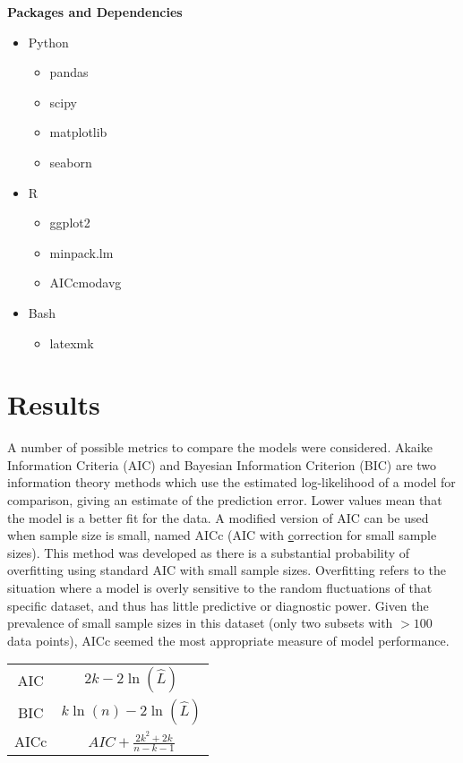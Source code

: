 \documentclass[11pt,a4wide,titlepage]{article}
\begin{document}
\noindent
\textbf{Packages and Dependencies}
\begin{itemize}
    \item Python
    \begin{itemize}
        \item pandas
        \item scipy
        \item matplotlib
        \item seaborn
    \end{itemize}
    \item R
    \begin{itemize}
        \item ggplot2
        \item minpack.lm
        \item AICcmodavg
    \end{itemize}
	\item Bash
	\begin{itemize}
		\item latexmk
	\end{itemize}
\end{itemize}



\section*{Results}
A number of possible metrics to compare the models were considered. Akaike Information Criteria (AIC) and Bayesian Information Criterion (BIC) are two information theory methods which use the estimated log-likelihood of a model for comparison, giving an estimate of the prediction error. Lower values mean that the model is a better fit for the data. A modified version of AIC can be used when sample size is small, named AICc (AIC with \underline{c}orrection for small sample sizes). This method was developed as there is a substantial probability of overfitting using standard AIC with small sample sizes. Overfitting refers to the situation where a model is overly sensitive to the random fluctuations of that specific dataset, and thus has little predictive or diagnostic power. Given the prevalence of small sample sizes in this dataset (only two subsets with $>100$ data points), AICc seemed the most appropriate measure of model performance.

\begin{center}
\def\arraystretch{1.5}
\begin{tabular}{|c|c|}
	\hline
	AIC & $2k - 2\ln(\hat{L})$\\
	BIC & $k\ln(n) - 2\ln(\hat{L})$\\
	AICc & $AIC + \frac{2k^2 + 2k}{n - k - 1}$\\
	\hline
\end{tabular}
\end{center}
\end{document}

